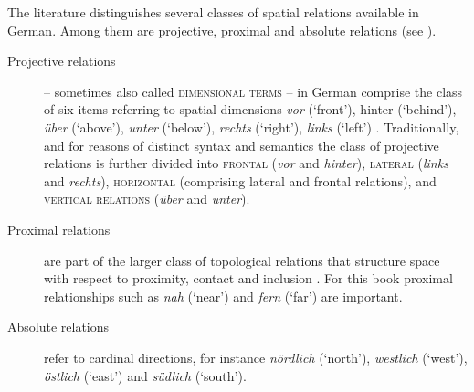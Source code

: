 The literature distinguishes several classes of spatial relations 
available in German. Among them are projective, proximal and absolute relations
(see ).
\begin{description}
\item[Projective relations]-- sometimes also called \textsc{dimensional terms} 
\citep{eschenbach2004functional,herskovits1986language} --  
in German comprise the class of six items referring to spatial dimensions
\textit{vor} (`front'), hinter (`behind'), \textit{\"uber} (`above'), \textit{unter} (`below'), \textit{rechts} (`right'), 
\textit{links} (`left') \citep{tenbrink2007space,tenbrink2005localising,wunderlich1991lokale}. 
Traditionally, and for reasons of distinct syntax and semantics the
class of projective relations is further divided into \textsc{frontal} (\textit{vor} 
and \textit{hinter}), \textsc{lateral} (\textit{links} and \textit{rechts}), 
\textsc{horizontal} (comprising lateral and frontal relations), and 
\textsc{vertical relations} (\textit{\"uber} and \textit{unter}). 
\item[Proximal relations] are part of the larger class of topological relations
that structure space with respect to proximity, contact and inclusion 
\citep{Grabowski1996prepositional}. For this book proximal relationships
such as \textit{nah} (`near') and \textit{fern} (`far') are important.
\item[Absolute relations] refer to cardinal directions,
for instance \textit{n\"ordlich} (`north'), \textit{westlich} (`west'), \textit{\"ostlich} (`east') and
\textit{s\"udlich} (`south').
\end{description}

